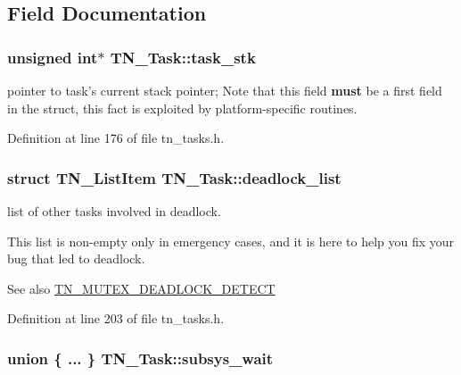\subsection{Field Documentation}
\hypertarget{structTN__Task_a1cca1eb0979241a8b5a33d8c9f16bc59}{
\subsubsection[{task\+\_\+stk}]{\setlength{\rightskip}{0pt plus 5cm}unsigned int$\ast$ T\+N\+\_\+\+Task\+::task\+\_\+stk}}\label{structTN__Task_a1cca1eb0979241a8b5a33d8c9f16bc59}


pointer to task's current stack pointer; Note that this field {\bfseries must} be a first field in the struct, this fact is exploited by platform-\/specific routines. 



Definition at line 176 of file tn\+\_\+tasks.\+h.

\hypertarget{structTN__Task_a097e79851e01fb3c73f0346d99ea8b7e}{
\subsubsection[{deadlock\+\_\+list}]{\setlength{\rightskip}{0pt plus 5cm}struct T\+N\+\_\+\+List\+Item T\+N\+\_\+\+Task\+::deadlock\+\_\+list}}\label{structTN__Task_a097e79851e01fb3c73f0346d99ea8b7e}


list of other tasks involved in deadlock. 

This list is non-\/empty only in emergency cases, and it is here to help you fix your bug that led to deadlock.

\begin{DoxySeeAlso}{See also}
{\ttfamily \hyperlink{tn__cfg__default_8h_a6ed3ec7b0d4338e7f60dde86b7ea5fa4}{T\+N\+\_\+\+M\+U\+T\+E\+X\+\_\+\+D\+E\+A\+D\+L\+O\+C\+K\+\_\+\+D\+E\+T\+E\+C\+T}} 
\end{DoxySeeAlso}


Definition at line 203 of file tn\+\_\+tasks.\+h.

\hypertarget{structTN__Task_a7b1e431e2e2c65d8de74d48b44cf68ee}{
\subsubsection[{subsys\+\_\+wait}]{\setlength{\rightskip}{0pt plus 5cm}union \{ ... \}   T\+N\+\_\+\+Task\+::subsys\+\_\+wait}}\label{structTN__Task_a7b1e431e2e2c65d8de74d48b44cf68ee}


